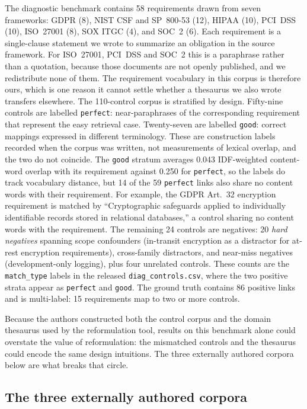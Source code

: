 \documentclass[smallextended,natbib]{svjour3}
\begin{document}
The diagnostic benchmark contains 58 requirements drawn from seven frameworks: GDPR (8), NIST CSF and SP~800-53 (12), HIPAA (10), PCI~DSS (10), ISO~27001 (8), SOX ITGC (4), and SOC~2 (6).
Each requirement is a single-clause statement we wrote to summarize an obligation in the source framework.
For ISO~27001, PCI~DSS and SOC~2 this is a paraphrase rather than a quotation, because those documents are not openly published, and we redistribute none of them.
The requirement vocabulary in this corpus is therefore ours, which is one reason it cannot settle whether a thesaurus we also wrote transfers elsewhere.
The 110-control corpus is stratified by design.
Fifty-nine controls are labelled \texttt{perfect}: near-paraphrases of the corresponding requirement that represent the easy retrieval case.
Twenty-seven are labelled \texttt{good}: correct mappings expressed in different terminology.
These are construction labels recorded when the corpus was written, not measurements of lexical overlap, and the two do not coincide.
The \texttt{good} stratum averages 0.043 IDF-weighted content-word overlap with its requirement against 0.250 for \texttt{perfect}, so the labels do track vocabulary distance, but 14 of the 59 \texttt{perfect} links also share no content words with their requirement.
For example, the GDPR Art.~32 encryption requirement is matched by ``Cryptographic safeguards applied to individually identifiable records stored in relational databases,'' a control sharing no content words with the requirement.
The remaining 24 controls are negatives: 20 \emph{hard negatives} spanning scope confounders (in-transit encryption as a distractor for at-rest encryption requirements), cross-family distractors, and near-miss negatives (development-only logging), plus four unrelated controls.
These counts are the \texttt{match\_type} labels in the released \texttt{diag\_controls.csv}, where the two positive strata appear as \texttt{perfect} and \texttt{good}.
The ground truth contains 86 positive links and is multi-label: 15 requirements map to two or more controls.

Because the authors constructed both the control corpus and the domain thesaurus used by the reformulation tool, results on this benchmark alone could overstate the value of reformulation: the mismatched controls and the thesaurus could encode the same design intuitions.
The three externally authored corpora below are what breaks that circle.

\subsection{The three externally authored corpora}
\label{sec:dataset-real}
\end{document}
